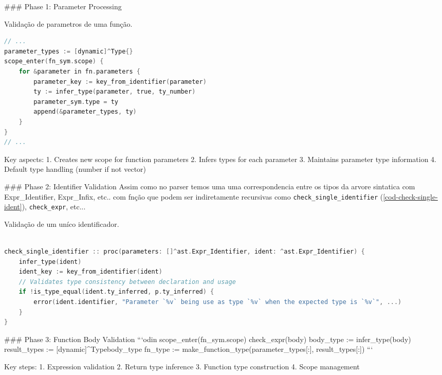 ### Phase 1: Parameter Processing

\begin{codigo}[htb]
    \caption{\small Validação de parametros de uma função. }
    \label{cod-parametros-validation}
\begin{lstlisting}[language=C, numbers=none, frame=none, inputencoding=latin1]
// ...
parameter_types := [dynamic]^Type{}
scope_enter(fn_sym.scope) {
    for &parameter in fn.parameters {
        parameter_key := key_from_identifier(parameter)
        ty := infer_type(parameter, true, ty_number)
        parameter_sym.type = ty
        append(&parameter_types, ty)
    }
}
// ...
\end{lstlisting}
\end{codigo}

Key aspects:
1. Creates new scope for function parameters
2. Infers types for each parameter
3. Maintains parameter type information
4. Default type handling (number if not vector)

### Phase 2: Identifier Validation
Assim como no parser temos uma uma correspondencia entre os tipos da arvore sintatica com Expr_Identifier, Expr_Infix, etc.. com fnção que podem ser indiretamente recursivas como \verb"check_single_identifier" (\autoref{cod-check-single-ident}), \verb"check_expr", etc...

\begin{codigo}[htb]
    \caption{\small Validação de um uníco identificador. }
    \label{cod-check-single-ident}
\begin{lstlisting}[language=C, numbers=none, frame=none, inputencoding=latin1]

check_single_identifier :: proc(parameters: []^ast.Expr_Identifier, ident: ^ast.Expr_Identifier) {
    infer_type(ident)
    ident_key := key_from_identifier(ident)
    // Validates type consistency between declaration and usage
    if !is_type_equal(ident.ty_inferred, p.ty_inferred) {
        error(ident.identifier, "Parameter `%v` being use as type `%v` when the expected type is `%v`", ...)
    }
}
\end{lstlisting}
\end{codigo}

### Phase 3: Function Body Validation
```odin
scope_enter(fn_sym.scope) {
    check_expr(body)
    body_type := infer_type(body)
    result_types := [dynamic]^Type{body_type}
    fn_type := make_function_type(parameter_types[:], result_types[:])
}
```

Key steps:
1. Expression validation
2. Return type inference
3. Function type construction
4. Scope management


